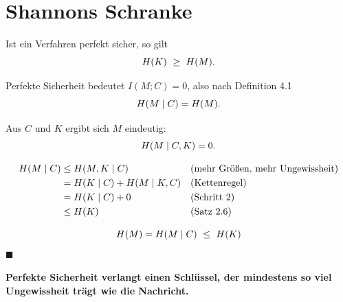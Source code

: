 \section{Shannons Schranke}

\begin{merksatz}
Ist ein Verfahren perfekt sicher, so gilt
\[ H(K) \ \ge\ H(M) . \]

Perfekte Sicherheit bedeutet $I(M;C)=0$, also nach Definition 4.1
\[ H(M\mid C) = H(M) . \]

Aus $C$ und $K$ ergibt sich $M$ eindeutig:
\[ H(M\mid C,K) = 0 . \]

\begin{align*}
H(M\mid C) &\le H(M,K\mid C) && \text{(mehr Größen, mehr Ungewissheit)}\\
&= H(K\mid C) + H(M\mid K,C) && \text{(Kettenregel)}\\
&= H(K\mid C) + 0 && \text{(Schritt 2)}\\
&\le H(K) && \text{(Satz 2.6)}
\end{align*}

\[ \Ent(M) = \Ent(M\mid C) \ \le\ \Ent(K) \]
$\blacksquare$

\begin{center}
\begin{minipage}{0.9\textwidth}
\textbf{Perfekte Sicherheit verlangt einen Schlüssel, der mindestens so viel Ungewissheit trägt wie die Nachricht.}
\end{minipage}
\end{center}

\begin{center}
\begin{minipage}{0.88\textwidth}
\end{minipage}
\end{center}
\end{merksatz}

